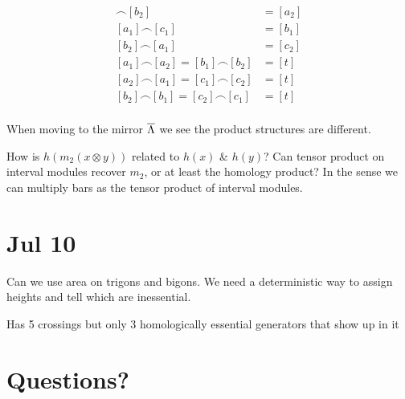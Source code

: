 \documentclass[11pt,oneside]{amsart}
\begin{document}
    \begin{align*}
        [c_1]\frown [b_2]&=[a_2]\\
        [a_1]\frown[c_1]&=[b_1]\\
        [b_2]\frown [a_1]&=[c_2]\\
        [a_1]\frown [a_2]=[b_1]\frown [b_2]&=[t]\\
        [a_2]\frown [a_1]=[c_1]\frown [c_2]&=[t]\\
        [b_2]\frown [b_1]=[c_2]\frown [c_1]&=[t]\\
    \end{align*}

When moving to the mirror $\overline{\Lambda}$ we see the product structures are different.

\begin{question}
    How is $h(m_2(x\otimes y))$ related to $h(x)$ \& $h(y)$?
    Can tensor product on interval modules recover $m_2$, or at least the homology product? In the sense we can multiply bars as the tensor product of interval modules.
\end{question}



\section{Jul 10}

\begin{question}
    Can we use area on trigons and bigons. We need a deterministic way to assign heights and tell which are inessential.
\end{question}

Has 5 crossings but only 3 homologically essential generators that show up in it





\section{Questions?}


\end{document}
